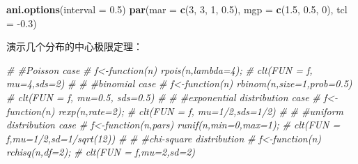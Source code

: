 \documentclass[]{article}
\newenvironment{Shaded}{\begin{snugshade}}{\end{snugshade}}
\newcommand{\KeywordTok}[1]{\textcolor[rgb]{0.13,0.29,0.53}{\textbf{{#1}}}}
\newcommand{\DataTypeTok}[1]{\textcolor[rgb]{0.13,0.29,0.53}{{#1}}}
\newcommand{\DecValTok}[1]{\textcolor[rgb]{0.00,0.00,0.81}{{#1}}}
\newcommand{\FloatTok}[1]{\textcolor[rgb]{0.00,0.00,0.81}{{#1}}}
\newcommand{\CommentTok}[1]{\textcolor[rgb]{0.56,0.35,0.01}{\textit{{#1}}}}
\newcommand{\NormalTok}[1]{{#1}}
\begin{document}
\begin{Shaded}
\begin{Highlighting}[]
\KeywordTok{ani.options}\NormalTok{(}\DataTypeTok{interval =} \FloatTok{0.5}\NormalTok{)}
\KeywordTok{par}\NormalTok{(}\DataTypeTok{mar =} \KeywordTok{c}\NormalTok{(}\DecValTok{3}\NormalTok{, }\DecValTok{3}\NormalTok{, }\DecValTok{1}\NormalTok{, }\FloatTok{0.5}\NormalTok{), }\DataTypeTok{mgp =} \KeywordTok{c}\NormalTok{(}\FloatTok{1.5}\NormalTok{, }\FloatTok{0.5}\NormalTok{, }\DecValTok{0}\NormalTok{), }\DataTypeTok{tcl =} \NormalTok{-}\FloatTok{0.3}\NormalTok{)}
\end{Highlighting}
\end{Shaded}

演示几个分布的中心极限定理：

\begin{Shaded}
\begin{Highlighting}[]
\CommentTok{# #Poisson case}
\CommentTok{#   f<-function(n) rpois(n,lambda=4);}
\CommentTok{#   clt(FUN = f, mu=4,sds=2)}
\CommentTok{# }
\CommentTok{# #binomial case}
\CommentTok{#   f<-function(n) rbinom(n,size=1,prob=0.5)}
\CommentTok{#   clt(FUN = f, mu=0.5, sds=0.5)}
\CommentTok{# }
\CommentTok{# #exponential distribution case}
\CommentTok{#   f<-function(n) rexp(n,rate=2);}
\CommentTok{#   clt(FUN = f, mu=1/2,sds=1/2)}
\CommentTok{# }
\CommentTok{# #uniform distribution case}
\CommentTok{#    f<-function(n,pars) runif(n,min=0,max=1);}
\CommentTok{#    clt(FUN = f,mu=1/2,sd=1/sqrt(12))}
\CommentTok{# }
\CommentTok{# #chi-square distribution}
\CommentTok{#   f<-function(n) rchisq(n,df=2);}
\CommentTok{#   clt(FUN = f,mu=2,sd=2)}
\end{Highlighting}
\end{Shaded}
\end{document}
